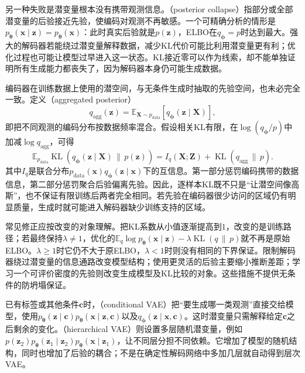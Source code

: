 另一种失败是潜变量根本没有携带观测信息。（posterior collapse）指部分或全部潜变量的后验接近先验，使编码对观测不再敏感。一个可精确分析的情形是$p_{\bm{\theta}}(\bm{x}\mid\bm{z})=p_{\bm{\theta}}(\bm{x})$：此时真实后验就是$p(\bm{z})$，ELBO在$q_{\bm{\phi}}=p$时达到最大。强大的解码器若能绕过潜变量解释数据，减少KL代价可能比利用潜变量更有利；优化过程也可能让模型过早进入这一状态。KL接近零可以作为线索，却不能单独证明所有生成能力都丧失了，因为解码器本身仍可能生成数据。

编码器在训练数据上使用的潜空间，与无条件生成时抽取的先验空间，也未必完全一致。定义（aggregated posterior）
\begin{equation}
  \label{eq:pgm-generative-aggregated-posterior}
  q_{\mathrm{agg}}(\bm{z})
  =\mathbb{E}_{\bm{X}\sim p_{\mathrm{data}}}
       [q_{\bm{\phi}}(\bm{z}\mid\bm{X})],
\end{equation}
即把不同观测的编码分布按数据频率混合。假设相关KL有限，在$\log(q_{\bm{\phi}}/p)$中加减$\log q_{\mathrm{agg}}$，可得
\begin{equation}
  \label{eq:pgm-generative-kl-information}
  \mathbb{E}_{p_{\mathrm{data}}}
    \operatorname{KL}(q_{\bm{\phi}}(\bm{z}\mid\bm{X})\,\|\,p(\bm{z}))
  =I_q(\bm{X};\bm{Z})+
    \operatorname{KL}(q_{\mathrm{agg}}\,\|\,p).
\end{equation}
其中$I_q$是联合分布$p_{\mathrm{data}}(\bm{x})q_{\bm{\phi}}(\bm{z}\mid\bm{x})$下的互信息。第一部分惩罚编码携带的数据信息，第二部分惩罚聚合后验偏离先验。因此，逐样本KL既不只是“让潜空间像高斯”，也不保证有限训练后两者完全相同。若先验在编码器很少访问的区域仍有明显质量，生成时就可能进入解码器缺少训练支持的区域。

常见修正应按改变的对象理解。把KL系数从小值逐渐提高到$1$，改变的是训练路径；若最终保持$\lambda\ne1$，优化的$\mathbb{E}_q\log p_{\bm{\theta}}(\bm{x}\mid\bm{z})-\lambda \operatorname{KL}(q\,\|\,p)$就不再是原始ELBO。$\lambda\geq1$时它仍不大于原ELBO，$\lambda<1$时则没有相同的下界保证。限制解码器绕过潜变量的信息通路改变模型结构；使用更灵活的后验主要缩小推断差距；学习一个可评价密度的先验则改变生成模型及KL比较的对象。这些措施不提供无条件的防坍塌保证。

已有标签或其他条件$\bm{c}$时，（conditional VAE）把“要生成哪一类观测”直接交给模型，使用$p_{\bm{\theta}}(\bm{z}\mid\bm{c})p_{\bm{\theta}}(\bm{x}\mid\bm{z},\bm{c})$以及$q_{\bm{\phi}}(\bm{z}\mid\bm{x},\bm{c})$。这时潜变量只需解释给定$\bm{c}$之后剩余的变化。（hierarchical VAE）则设置多层随机潜变量，例如$p(\bm{z}_2)p_{\bm{\theta}}(\bm{z}_1\mid\bm{z}_2)p_{\bm{\theta}}(\bm{x}\mid\bm{z}_1)$，让不同层分担不同依赖。它增加了模型的随机结构，同时也增加了后验的耦合；不是在确定性解码网络中多加几层就自动得到层次VAE。

